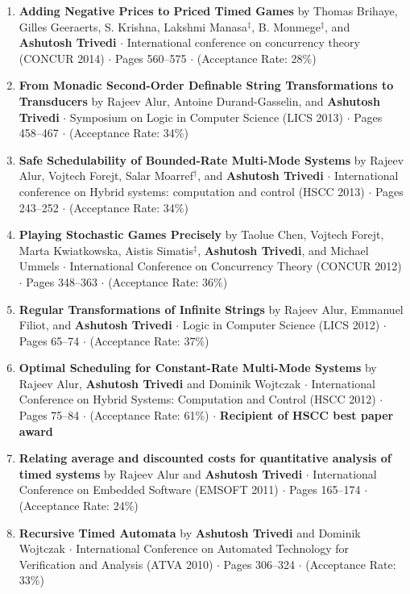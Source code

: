 \documentclass{article}
\begin{document}
\begin{enumerate}
\item
{\bf Adding Negative Prices to Priced Timed Games} by
Thomas Brihaye, Gilles Geeraerts, S. Krishna, Lakshmi Manasa${}^{\ddag}$,
B. Monmege${}^{\ddag}$, and {\bf Ashutosh Trivedi} $\cdot$  
International conference on concurrency theory (CONCUR
2014) $\cdot$ Pages 560--575
$\cdot$ (Acceptance Rate: 28\%)

\item 
  {\bf From Monadic Second-Order Definable String Transformations to Transducers}
  by Rajeev Alur, Antoine Durand-Gasselin, and {\bf Ashutosh Trivedi} $\cdot$ 
  Symposium on Logic in Computer Science (LICS 2013) $\cdot$ Pages 458--467
  $\cdot$ (Acceptance Rate: 34\%)
\item
  {\bf Safe Schedulability of Bounded-Rate Multi-Mode Systems} by Rajeev Alur,
  Vojtech Forejt, Salar Moarref${}^{\dag}$, and {\bf Ashutosh Trivedi} $\cdot$ 
  International conference on Hybrid systems: computation
  and control (HSCC 2013) $\cdot$ Pages 243--252
  $\cdot$ (Acceptance Rate: 34\%)
\item
   {\bf Playing Stochastic Games Precisely} by Taolue Chen, Vojtech Forejt,
  Marta Kwiatkowska, Aistis Simatis${}^{\ddag}$, {\bf Ashutosh Trivedi}, and 
  Michael Ummels $\cdot$
  International Conference on Concurrency Theory (CONCUR
  2012) $\cdot$ Pages 348--363
  $\cdot$ (Acceptance Rate: 36\%)
  
\item
  {\bf Regular Transformations of Infinite Strings} by
  Rajeev Alur, Emmanuel Filiot, and {\bf Ashutosh Trivedi} $\cdot$ Logic in Computer Science
  (LICS 2012) $\cdot$ Pages 65--74 $\cdot$ (Acceptance Rate: 37\%)
\item 
   {\bf Optimal Scheduling for Constant-Rate Multi-Mode Systems} by Rajeev Alur, {\bf
   Ashutosh Trivedi} and Dominik Wojtczak $\cdot$  International Conference on Hybrid Systems: Computation and Control
  (HSCC 2012) 
 $\cdot$ Pages 75--84
 $\cdot$ (Acceptance Rate: 61\%)
 $\cdot$ {\bf \color{green!40!black} Recipient of HSCC best paper award}
\item 
  {\bf Relating average and discounted costs for quantitative analysis of timed
    systems} by Rajeev Alur and {\bf Ashutosh Trivedi} $\cdot$ 
  International Conference on Embedded Software (EMSOFT 2011) 
  $\cdot$ Pages 165--174
  $\cdot$ (Acceptance Rate: 24\%)
\item
  {\bf Recursive Timed Automata} by {\bf  Ashutosh Trivedi} and Dominik Wojtczak $\cdot$
  International Conference on Automated Technology
  for Verification and Analysis (ATVA 2010) $\cdot$ Pages 306--324
  $\cdot$ (Acceptance Rate: 33\%)


\end{enumerate}
\end{document}
